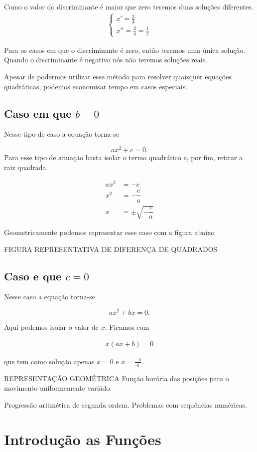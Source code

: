  Como o valor do discriminante é maior que zero teremos duas soluções diferentes.
 \begin{align*}
    \begin{cases}
    x'=\frac{3}{4}\\
    x''=\frac{2}{4}=\frac{1}{2}
    \end{cases}
 \end{align*}
 
 Para os casos em que o discriminante é zero, então teremos uma única solução. Quando o discriminante é negativo nós não teremos soluções reais.
 
 Apesar de podermos utilizar esse método para resolver quaisquer equações quadráticas, podemos economisar tempo em casos especiais.
 
 \subsection{Caso em que $b=0$}
 Nesse tipo de caso a equação \label{1.1} torna-se
 
 \begin{equation}\label{1.4}
     ax^2+c=0.
 \end{equation}
 Para esse tipo de situação basta isolar o termo quadrático e, por fim, retirar a raiz quadrada.
 
 \begin{align*}
     ax^2&=-c\\
     x^2&=-\dfrac{c}{a}\\
     x&=\pm \sqrt{-\dfrac{c}{a}}
 \end{align*}
 
 Geometricamente podemos representar esse caso com a figura abaixo
 
 FIGURA REPRESENTATIVA DE DIFERENÇA DE QUADRADOS
 
 
 \subsection{Caso e que $c=0$}
 Nesse caso a equação \label{1.1} torna-se
 
 \begin{equation}\label{1.5}
     ax^2+bx=0.
 \end{equation}
 
 Aqui podemos isolar o valor de $x$. Ficamos com 
 
 \begin{align*}
     x(ax+b)=0     
 \end{align*}
 
 que tem como solução apenas $x=0$ e $x=\frac{-b}{a}$.

REPRESENTAÇÃO GEOMÉTRICA
Função horária das posições para o movimento uniformemente variádo.

Progressão aritmética de segunda ordem. Problemas com sequências numéricas.

\section{Introdução as Funções}